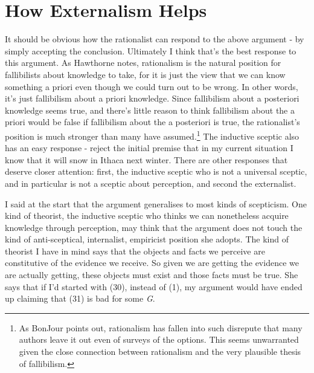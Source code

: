\section{How Externalism Helps}

It should be obvious how the rationalist can respond to the above argument - by simply accepting the conclusion. Ultimately I think that's the best response to this argument. As Hawthorne notes, rationalism is the natural position for fallibilists about knowledge to take, for it is just the view that we can know something a priori even though we could turn out to be wrong. In other words, it's just fallibilism about a priori knowledge. Since fallibilism about a posteriori knowledge seems true, and there's little reason to think fallibilism about the a priori would be false if fallibilism about the a posteriori is true, the rationalist's position is much stronger than many have assumed.\footnote{As BonJour points out, rationalism has fallen into such disrepute that many authors leave it out even of surveys of the options. This seems unwarranted given the close connection between rationalism and the very plausible thesis of fallibilism.} The inductive sceptic also has an easy response - reject the initial premise that in my current situation I know that it will snow in Ithaca next winter. There are other responses that deserve closer attention: first, the inductive sceptic who is not a universal sceptic, and in particular is not a sceptic about perception, and second the externalist. 

I said at the start that the argument generalises to most kinds of scepticism. One kind of theorist, the inductive sceptic who thinks we can nonetheless acquire knowledge through perception, may think that the argument does not touch the kind of anti-sceptical, internalist, empiricist position she adopts. The kind of theorist I have in mind says that the objects and facts we perceive are constitutive of the evidence we receive. So given we are getting the evidence we are actually getting, these objects must exist and those facts must be true. She says that if I'd started with (30), instead of (1), my argument would have ended up claiming that (31) is bad for some \textit{G}.



